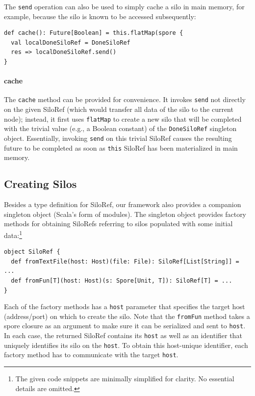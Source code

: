 \documentclass[preprint]{sigplanconf}
\theoremstyle{definition}
\theoremstyle{definition}
\begin{document}
The \verb|send| operation can also be used to simply cache a silo in main
memory, for example, because the silo is known to be accessed subsequently:

\begin{lstlisting}
def cache(): Future[Boolean] = this.flatMap(spore {
  val localDoneSiloRef = DoneSiloRef
  res => localDoneSiloRef.send()
}
\end{lstlisting}

\paragraph{cache}
The \verb|cache| method can be provided for convenience. It invokes
\verb|send| not directly on the given SiloRef (which would transfer all data
of the silo to the current node); instead, it first uses \verb|flatMap| to
create a new silo that will be completed with the trivial value (e.g., a
Boolean constant) of the \verb|DoneSiloRef| singleton object. Essentially,
invoking \verb|send| on this trivial SiloRef causes the resulting future to be
completed as soon as \verb|this| SiloRef has been materialized in main memory.



\subsection{Creating Silos}
\label{sec:creating-silos}

Besides a type definition for SiloRef, our framework also provides a companion
singleton object (Scala's form of modules). The singleton object provides
factory methods for obtaining SiloRefs referring to silos populated with some
initial data:\footnote{The given code snippets are minimally simplified for
clarity. No essential details are omitted.}

\begin{lstlisting}
object SiloRef {
  def fromTextFile(host: Host)(file: File): SiloRef[List[String]] = ...
  def fromFun[T](host: Host)(s: Spore[Unit, T]): SiloRef[T] = ...
}
\end{lstlisting}

Each of the factory methods has a \verb|host| parameter that specifies the
target host (address/port) on which to create the silo. Note that the
\verb|fromFun| method takes a spore closure as an argument to make sure it can
be serialized and sent to \verb|host|. In each case, the returned SiloRef
contains its \verb|host| as well as an identifier that uniquely identifies its
silo on the \verb|host|. To obtain this host-unique identifier, each factory
method has to communicate with the target \verb|host|.
\end{document}
